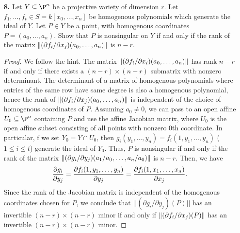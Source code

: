 \documentclass[a4paper]{article}
\begin{document}
\begin{enumerate} [label=\textbf{\arabic*.}, leftmargin=0cm]
\begin{proof}
\begin{itemize} [leftmargin=0cm]
                  \item[(d)] If $t \neq 0$, then we have the equation $x^2 = u^3$, which is a cusp.
                        If $u \neq 0$, then we have the equation $1 = t^5 y^2$, which does not meet the exceptional curve.
              \end{itemize}
          \end{proof}

    \item[\textbf{8.}] Let $Y \subseteq \P^n$ be a projective variety of dimension $r$. Let $f_1, \dots, f_t \in S = k[x_0, \dots, x_n]$ be homogenous polynomials which generate the ideal of $Y$. Let $P \in Y$ be a point, with homogenous coordinates $P = (a_0, \dots, a_n)$. Show that $P$ is nonsingular on $Y$ if and only if the rank of the matrix $\norm{(\partial f_i / \partial x_j)(a_0, \dots, a_n)}$ is $n - r$.

          \begin{proof}
              We follow the hint.
              The matrix $\norm{(\partial f_i / \partial x_i)(a_0, \dots, a_n)}$ has rank $n-r$ if and only if there exists a $(n - r) \times (n - r)$ submatrix with nonzero determinant.
              The determinant of a matrix of homogenous polynomials where entries of the same row have same degree is also a homogenous polynomial, hence the rank of $\norm{(\partial f_i / \partial x_j)(a_0, \dots, a_n)}$ is independent of the choice of homogenous coordinates of $P$.
              Assuming $a_0 \neq 0$, we can pass to an open affine $U_0 \subseteq \P^n$ containing $P$ and use the affine Jacobian matrix, where $U_0$ is the open affine subset consisting of all points with nonzero $0$th coordinate.
              In particular, f we set $Y_0 = Y \cap U_0$, then $g_i(y_1, \dots, y_n) = f_i(1, y_1, \dots, y_n)$ ($1 \leq i \leq t$) generate the ideal of $Y_0$.
              Thus, $P$ is nonsingular if and only if the rank of the matrix $\norm{(\partial g_i / \partial y_j)(a_1 / a_0, \dots, a_n / a_0)}$ is $n - r$.
              Then, we have
              \begin{equation*}
                  \pdv{g_i}{y_j} = \pdv{f_i(1, y_1, \dots, y_n)}{y_j} = \pdv{f_i(1, x_1, \dots, x_n)}{x_j}.
              \end{equation*}
Since the rank of the Jacobian matrix is independent of the homogenous coordinates chosen for $P$,
              we conclude that $|| (\partial g_i / \partial y_j)(P) ||$ has an invertible $(n - r) \times (n - r)$ minor if and only if $\norm{(\partial f_i / \partial x_j)(P)}$ has an invertible $(n - r) \times (n - r)$ minor.
          \end{proof}


\end{enumerate}
\end{document}

